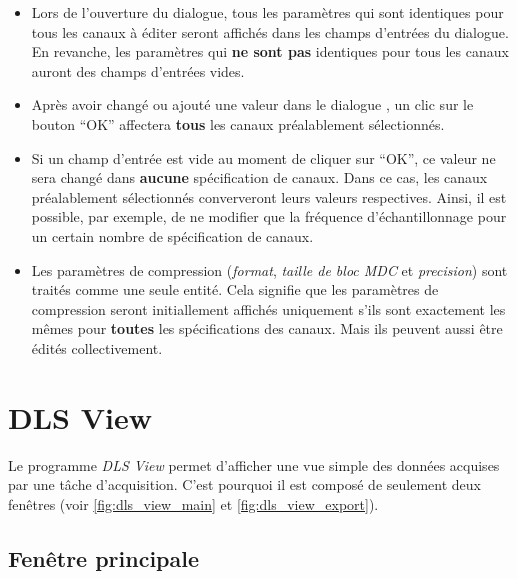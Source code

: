 \documentclass[a4paper,12pt,BCOR6mm,bibtotoc,idxtotoc]{scrbook}
\begin{document}
\begin{itemize}
\item Lors de l'ouverture du dialogue, tous les param\`etres
  qui sont identiques pour tous les canaux \`a \'editer seront
  affich\'es dans les champs d'entr\'ees du dialogue.
  En revanche, les param\`etres qui \textbf{ne sont pas} identiques pour
  tous les canaux auront des champs d'entr\'ees vides.

\item Apr\`es avoir chang\'e ou ajout\'e une valeur dans le
  dialogue , un clic sur le bouton ``OK'' affectera \textbf{tous} les
  canaux pr\'ealablement s\'electionn\'es.


\item Si un champ d'entr\'ee est vide au moment de cliquer sur ``OK'',
  ce valeur ne sera chang\'e dans \textbf{aucune} sp\'ecification de canaux.
  Dans ce cas, les canaux pr\'ealablement s\'electionn\'es
  conververont leurs valeurs respectives.
  Ainsi, il est possible, par exemple, de ne modifier que la fr\'equence
  d'\'echantillonnage pour un certain nombre de sp\'ecification de canaux.

\item Les param\`etres de compression (\textit{format}, \textit{taille
  de bloc MDC} et \textit{precision}) sont trait\'es comme une seule
  entit\'e. Cela signifie que les param\`etres de compression seront
  initiallement affich\'es uniquement s'ils sont exactement les m\^emes
  pour \textbf{toutes} les sp\'ecifications des canaux. Mais ils
  peuvent aussi \^etre \'edit\'es collectivement.

\end{itemize}


\chapter{DLS View}
\label{sec:view}

Le programme \textit{DLS View} permet d'afficher une vue simple des
donn\'ees acquises par une t\^ache d'acquisition.  C'est pourquoi il
est compos\'e de seulement deux fen\^etres (voir
\autoref{fig:dls_view_main} et \autoref{fig:dls_view_export}).


\section{Fen\^etre principale}
\label{sec:view_main}
\end{document}
